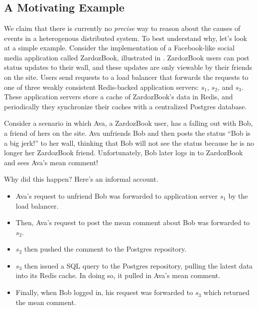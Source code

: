 \section{\WatProvenance{}}

\subsection{A Motivating Example}
\newcommand{\systemname}{ZardozBook}
We claim that there is currently no \emph{precise} way to reason about the
causes of events in a heterogenous distributed system. To best understand why,
let's look at a simple example.  Consider the implementation of a Facebook-like
social media application called \systemname{}, illustrated in
. \systemname{} users can post status updates to their
wall, and these updates are only viewable by their friends on the site. Users
send requests to a load balancer that forwards the requests to one of three
weakly consistent Redis-backed application servers: $s_1$, $s_2$, and $s_3$.
These application servers store a cache of \systemname{}'s data in Redis, and
periodically they synchronize their caches with a centralized Postgres
database.

Consider a scenario in which Ava, a \systemname{} user, has a falling out with
Bob, a friend of hers on the site. Ava unfriends Bob and then posts the status
``Bob is a big jerk!'' to her wall, thinking that Bob will not see the status
because he is no longer her \systemname{} friend. Unfortunately, Bob later logs
in to \systemname{} and sees Ava's mean comment!

{}

Why did this happen? Here's an informal account.
\begin{itemize}
  \item
    Ava's request to unfriend Bob was forwarded to application server $s_1$ by
    the load balancer.
  \item
    Then, Ava's request to post the mean comment about Bob was forwarded to
    $s_2$.
  \item
    $s_2$ then pushed the comment to the Postgres repository.
  \item
    $s_3$ then issued a SQL query to the Postgres repository, pulling the
    latest data into its Redis cache. In doing so, it pulled in Ava's mean
    comment.
  \item
    Finally, when Bob logged in, his request was forwarded to $s_3$ which
    returned the mean comment.
\end{itemize}

